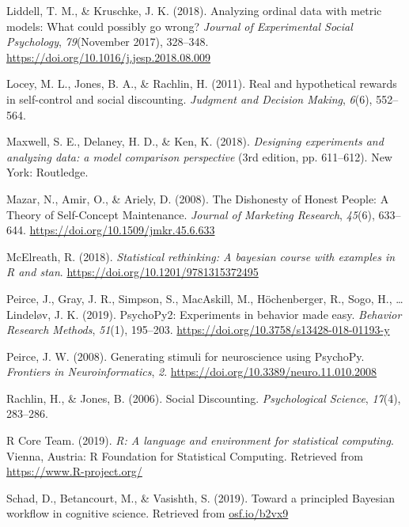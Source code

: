 \documentclass[12pt,]{article}
\begin{document}
\leavevmode\hypertarget{ref-Liddell2018}{}%
Liddell, T. M., \& Kruschke, J. K. (2018). Analyzing ordinal data with
metric models: What could possibly go wrong? \emph{Journal of
Experimental Social Psychology}, \emph{79}(November 2017), 328--348.
\url{https://doi.org/10.1016/j.jesp.2018.08.009}

\leavevmode\hypertarget{ref-Locey2011}{}%
Locey, M. L., Jones, B. A., \& Rachlin, H. (2011). Real and hypothetical
rewards in self-control and social discounting. \emph{Judgment and
Decision Making}, \emph{6}(6), 552--564.

\leavevmode\hypertarget{ref-Maxwell2018}{}%
Maxwell, S. E., Delaney, H. D., \& Ken, K. (2018). \emph{Designing
experiments and analyzing data: a model comparison perspective} (3rd
edition, pp. 611--612). New York: Routledge.

\leavevmode\hypertarget{ref-Mazar2008}{}%
Mazar, N., Amir, O., \& Ariely, D. (2008). The Dishonesty of Honest
People: A Theory of Self-Concept Maintenance. \emph{Journal of Marketing
Research}, \emph{45}(6), 633--644.
\url{https://doi.org/10.1509/jmkr.45.6.633}

\leavevmode\hypertarget{ref-McElreath2018}{}%
McElreath, R. (2018). \emph{Statistical rethinking: A bayesian course
with examples in R and stan}.
\url{https://doi.org/10.1201/9781315372495}

\leavevmode\hypertarget{ref-Peirce2019}{}%
Peirce, J., Gray, J. R., Simpson, S., MacAskill, M., Höchenberger, R.,
Sogo, H., \ldots{} Lindeløv, J. K. (2019). PsychoPy2: Experiments in
behavior made easy. \emph{Behavior Research Methods}, \emph{51}(1),
195--203. \url{https://doi.org/10.3758/s13428-018-01193-y}

\leavevmode\hypertarget{ref-Peirce2008}{}%
Peirce, J. W. (2008). Generating stimuli for neuroscience using
PsychoPy. \emph{Frontiers in Neuroinformatics}, \emph{2}.
\url{https://doi.org/10.3389/neuro.11.010.2008}

\leavevmode\hypertarget{ref-Rachlin2006}{}%
Rachlin, H., \& Jones, B. (2006). Social Discounting.
\emph{Psychological Science}, \emph{17}(4), 283--286.

\leavevmode\hypertarget{ref-R2019}{}%
R Core Team. (2019). \emph{R: A language and environment for statistical
computing}. Vienna, Austria: R Foundation for Statistical Computing.
Retrieved from \url{https://www.R-project.org/}

\leavevmode\hypertarget{ref-Schad2019}{}%
Schad, D., Betancourt, M., \& Vasishth, S. (2019). Toward a principled
Bayesian workflow in cognitive science. Retrieved from
\url{osf.io/b2vx9}
\end{document}

